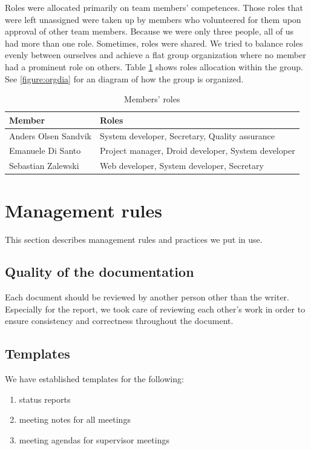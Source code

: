 Roles were allocated primarily on team members' competences.
Those roles that were left unassigned were taken up by members who volunteered for them upon approval 
of other team members.
Because we were only three people, all of us had more than one role. Sometimes, roles were shared.
We tried to balance roles evenly between ourselves and achieve a flat group organization where no member
had a prominent role on others. Table \ref{table:roles} shows roles allocation within the group.
See \ref{figure:orgdia} for an diagram of how the group is organized.

\begin{table}[h]
\begin{center}
\begin{tabular}{ | l | l | }
  \hline
  \textbf{Member} & \textbf{Roles} \\
  \hline\noalign{\smallskip}\hline
  Anders Olsen Sandvik  &  System developer, Secretary, Quality assurance\\
  Emanuele Di Santo     &  Project manager, Droid developer, System developer\\
  Sebastian Zalewski    &  Web developer, System developer, Secretary\\
  \hline
\end{tabular}
\end{center}
\caption{Members' roles}
\label{table:roles}
\end{table}

\newpage
\section{Management rules}
\label{section:rules}

This section describes management rules and practices we put in use.%

\subsection{Quality of the documentation}
Each document should be reviewed by another person other than the writer.
Especially for the report, we took care of reviewing each other's work in order to ensure
consistency and correctness throughout the document.

\subsection{Templates}
We have established templates for the following:
\begin{enumerate}
\item status reports
\item meeting notes for all meetings
\item meeting agendas for supervisor meetings
\end{enumerate}

